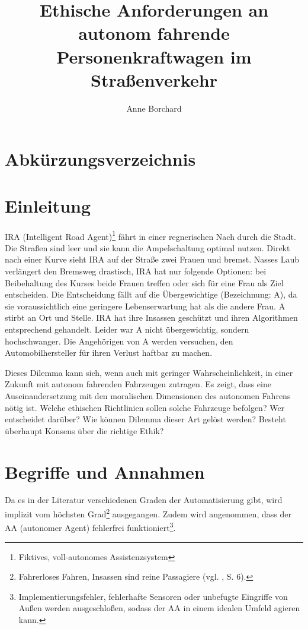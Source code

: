 \documentclass[a4paper, 12pt, titlepage]{scrartcl}
\begin{document}
\author{Anne Borchard}
\title{Ethische Anforderungen an autonom fahrende Personenkraftwagen im Stra\ss enverkehr}
\publishers{Humboldt-Universit\"at zu Berlin}
\maketitle
\tableofcontents
\newpage

\section*{Abk\"urzungsverzeichnis}
\begin{acronym}
\end{acronym}
\newpage

\section{Einleitung}
	IRA (Intelligent Road Agent)\footnote{Fiktives, voll-autonomes Assistenzsystem} fährt in einer regnerischen Nach durch die Stadt. Die Straßen sind leer und sie kann die Ampelschaltung optimal nutzen. Direkt nach einer Kurve sieht IRA auf der Straße zwei Frauen und bremst. Nasses Laub verl\"angert den Bremsweg drastisch, IRA hat nur folgende Optionen: bei Beibehaltung des Kurses beide Frauen treffen oder sich f\"ur eine Frau als Ziel entscheiden. Die Entscheidung fällt auf die \"Ubergewichtige (Bezeichnung: A), da sie voraussichtlich eine geringere Lebenserwartung hat als die andere Frau. A stirbt an Ort und Stelle. IRA hat ihre Insassen geschützt und ihren Algorithmen entsprechend gehandelt. Leider war A nicht übergewichtig, sondern hochschwanger. Die Angehörigen von A werden versuchen, den Automobilhersteller für ihren Verlust haftbar zu machen.
	
	Dieses Dilemma kann sich, wenn auch mit geringer Wahrscheinlichkeit, in einer Zukunft mit autonom fahrenden Fahrzeugen zutragen. Es zeigt, dass eine Auseinandersetzung mit den moralischen Dimensionen des autonomen Fahrens n\"otig ist. Welche ethischen Richtlinien sollen solche Fahrzeuge befolgen? Wer entscheidet dar\"uber? Wie k\"onnen Dilemma dieser Art gel\"ost werden? Besteht \"uberhaupt Konsens \"uber die \glqq richtige\grqq{} Ethik?
\section{Begriffe und Annahmen}
	Da es in der Literatur verschiedenen Graden der Automatisierung gibt, wird implizit vom h\"ochsten Grad\footnote{Fahrerloses Fahren, Insassen sind reine Passagiere (vgl. \autocite{bmvi2015}, S. 6).} ausgegangen. Zudem wird angenommen, dass der AA (autonomer Agent) fehlerfrei funktioniert\footnote{Implementierungsfehler, fehlerhafte Sensoren oder unbefugte Eingriffe von Au\ss en werden ausgeschlo\ss en, sodass der AA in einem idealen Umfeld agieren kann.}.
	
\end{document}
